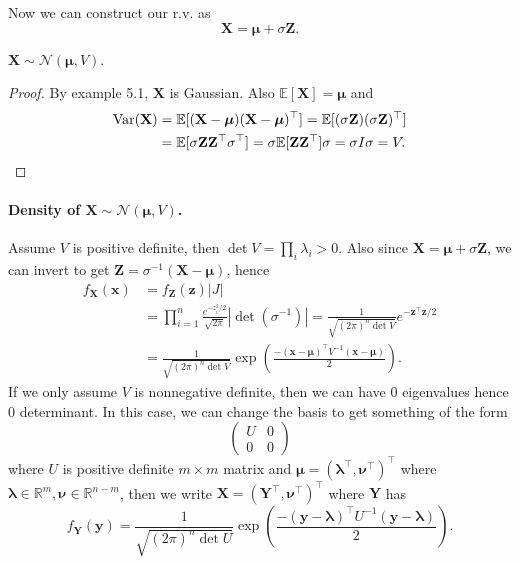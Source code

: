 Now we can construct our r.v. as 
\[
    \mathbf{X} = \boldsymbol{\mu}+ \sigma \mathbf{Z}.
\]
\begin{claim}
    $ \mathbf{X} \sim \mathcal{N}(\boldsymbol{\mu},V) $.
\end{claim}
\begin{proof}
    By example 5.1, $\mathbf{X}$ is Gaussian. Also $ \mathbb{E}[\mathbf{X}]=\boldsymbol{\mu} $ and
    \begin{align*}
        \operatorname{Var}(\mathbf{X})&= \mathbb{E}[(\mathbf{X}-\boldsymbol{\mu})(\mathbf{X}-\boldsymbol{\mu})^\top]=\mathbb{E}[(\sigma\mathbf{Z})(\sigma\mathbf{Z})^\top ]\\ 
        &= \mathbb{E}[\sigma\mathbf{Z} \mathbf{Z}^\top \sigma^\top ] = \sigma \mathbb{E}[\mathbf{Z} \mathbf{Z}^\top]\sigma = \sigma I \sigma = V.\qedhere
    \end{align*}
\end{proof}

\paragraph{Density of $ \mathbf{X} \sim \mathcal{N}(\boldsymbol{\mu},V) $.} Assume $V$ is positive definite, then $\det V=\prod_i\lambda_i>0$. Also since $\mathbf{X}=\boldsymbol{\mu}+\sigma \mathbf{Z}$, we can invert to get $\mathbf{Z}=\sigma^{-1}(\mathbf{X}-\boldsymbol{\mu})$, hence
\begin{align*}
    f_\mathbf{X}(\mathbf{x})&=f_\mathbf{Z}(\mathbf{z})|J|\\
    &=\prod_{i=1}^n\frac{e^{-z_i^2/2}}{\sqrt{2\pi}}|\det(\sigma^{-1})|=\frac{1}{\sqrt{(2\pi)^n\det V}}e^{-\mathbf{z}^\top \mathbf{z}/2}\\
    &=\frac{1}{\sqrt{(2\pi)^n\det V}}\exp \left( \frac{-(\mathbf{x}-\boldsymbol{\mu})^\top V^{-1}(\mathbf{x}-\boldsymbol{\mu})}{2} \right).
\end{align*}
If we only assume $V$ is nonnegative definite, then we can have $0$ eigenvalues hence $0$ determinant.
In this case, we can change the basis to get something of the form
$$\begin{pmatrix}
    U&0\\
    0&0
\end{pmatrix}$$
where $U$ is positive definite $m\times m$ matrix and $\boldsymbol{\mu}=(\boldsymbol{\lambda}^\top,\boldsymbol{\nu}^\top)^\top$ where $\boldsymbol{\lambda}\in\mathbb R^m,\boldsymbol{\nu}\in\mathbb R^{n-m}$, then we write $\mathbf{X}=(\mathbf{Y}^\top,\boldsymbol{\nu}^\top)^\top$ where $\mathbf{Y}$ has
$$f_\mathbf{Y}(\mathbf{y})=\frac{1}{\sqrt{(2\pi)^n\det U}}\exp \left( \frac{-(\mathbf{y}-\boldsymbol{\lambda})^\top U^{-1}(\mathbf{y}-\boldsymbol{\lambda})}{2} \right).$$

